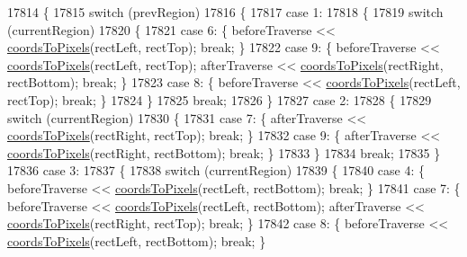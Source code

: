 \begin{DoxyCode}
17814 \{
17815   \textcolor{keywordflow}{switch} (prevRegion)
17816   \{
17817     \textcolor{keywordflow}{case} 1:
17818     \{
17819       \textcolor{keywordflow}{switch} (currentRegion)
17820       \{
17821         \textcolor{keywordflow}{case} 6: \{ beforeTraverse << \hyperlink{class_q_c_p_abstract_plottable_ade710a776104b14c1c835168ce1bfc5c}{coordsToPixels}(rectLeft, rectTop); \textcolor{keywordflow}{break}; \}
17822         \textcolor{keywordflow}{case} 9: \{ beforeTraverse << \hyperlink{class_q_c_p_abstract_plottable_ade710a776104b14c1c835168ce1bfc5c}{coordsToPixels}(rectLeft, rectTop); afterTraverse << 
      \hyperlink{class_q_c_p_abstract_plottable_ade710a776104b14c1c835168ce1bfc5c}{coordsToPixels}(rectRight, rectBottom); \textcolor{keywordflow}{break}; \}
17823         \textcolor{keywordflow}{case} 8: \{ beforeTraverse << \hyperlink{class_q_c_p_abstract_plottable_ade710a776104b14c1c835168ce1bfc5c}{coordsToPixels}(rectLeft, rectTop); \textcolor{keywordflow}{break}; \}
17824       \}
17825       \textcolor{keywordflow}{break};
17826     \}
17827     \textcolor{keywordflow}{case} 2:
17828     \{
17829       \textcolor{keywordflow}{switch} (currentRegion)
17830       \{
17831         \textcolor{keywordflow}{case} 7: \{ afterTraverse << \hyperlink{class_q_c_p_abstract_plottable_ade710a776104b14c1c835168ce1bfc5c}{coordsToPixels}(rectRight, rectTop); \textcolor{keywordflow}{break}; \}
17832         \textcolor{keywordflow}{case} 9: \{ afterTraverse << \hyperlink{class_q_c_p_abstract_plottable_ade710a776104b14c1c835168ce1bfc5c}{coordsToPixels}(rectRight, rectBottom); \textcolor{keywordflow}{break}; \}
17833       \}
17834       \textcolor{keywordflow}{break};
17835     \}
17836     \textcolor{keywordflow}{case} 3:
17837     \{
17838       \textcolor{keywordflow}{switch} (currentRegion)
17839       \{
17840         \textcolor{keywordflow}{case} 4: \{ beforeTraverse << \hyperlink{class_q_c_p_abstract_plottable_ade710a776104b14c1c835168ce1bfc5c}{coordsToPixels}(rectLeft, rectBottom); \textcolor{keywordflow}{break}; \}
17841         \textcolor{keywordflow}{case} 7: \{ beforeTraverse << \hyperlink{class_q_c_p_abstract_plottable_ade710a776104b14c1c835168ce1bfc5c}{coordsToPixels}(rectLeft, rectBottom); afterTraverse << 
      \hyperlink{class_q_c_p_abstract_plottable_ade710a776104b14c1c835168ce1bfc5c}{coordsToPixels}(rectRight, rectTop); \textcolor{keywordflow}{break}; \}
17842         \textcolor{keywordflow}{case} 8: \{ beforeTraverse << \hyperlink{class_q_c_p_abstract_plottable_ade710a776104b14c1c835168ce1bfc5c}{coordsToPixels}(rectLeft, rectBottom); \textcolor{keywordflow}{break}; \}

\end{DoxyCode}
